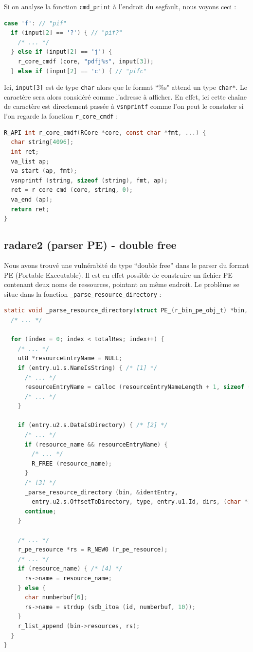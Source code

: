Si on analyse la fonction \lstinline{cmd_print} à l'endroit du segfault, nous voyons ceci :

\begin{lstlisting}[language=C]
case 'f': // "pif"
  if (input[2] == '?') { // "pif?"
    /* ... */
  } else if (input[2] == 'j') {
    r_core_cmdf (core, "pdfj%s", input[3]);
  } else if (input[2] == 'c') { // "pifc"
\end{lstlisting}

Ici, \lstinline{input[3]} est de type \lstinline{char} alors que le format ``\%s" attend un type \lstinline{char*}.
Le caractère sera alors considéré comme l'adresse à afficher.
En effet, ici cette chaîne de caractère est directement passée à \lstinline{vsnprintf} comme l'on peut le constater si l'on regarde la fonction \lstinline{r_core_cmdf} :

\begin{lstlisting}[language=C]
R_API int r_core_cmdf(RCore *core, const char *fmt, ...) {
  char string[4096];
  int ret;
  va_list ap;
  va_start (ap, fmt);
  vsnprintf (string, sizeof (string), fmt, ap);
  ret = r_core_cmd (core, string, 0);
  va_end (ap);
  return ret;
}
\end{lstlisting}

\subsection{radare2 (parser PE) - double free}

Nous avons trouvé une vulnérabité de type ``double free'' dans le parser du format PE (Portable Executable). Il est en effet possible de construire un fichier PE contenant deux noms de ressources, pointant au même endroit. Le problème se situe dans la fonction \lstinline{_parse_resource_directory} :

\begin{lstlisting}[language=C]
static void _parse_resource_directory(struct PE_(r_bin_pe_obj_t) *bin, Pe_image_resource_directory *dir, ut64 offDir, int type, int id, HtUU *dirs, char *resource_name) {
  /* ... */

  for (index = 0; index < totalRes; index++) {
    /* ... */
    ut8 *resourceEntryName = NULL;
    if (entry.u1.s.NameIsString) { /* [1] */
      /* ... */
      resourceEntryName = calloc (resourceEntryNameLength + 1, sizeof (ut8));
      /* ... */
    }

    if (entry.u2.s.DataIsDirectory) { /* [2] */
      /* ... */
      if (resource_name && resourceEntryName) {
        /* ... */
        R_FREE (resource_name);
      }
      /* [3] */
      _parse_resource_directory (bin, &identEntry,
        entry.u2.s.OffsetToDirectory, type, entry.u1.Id, dirs, (char *)resourceEntryName);
      continue;
    }

    /* ... */
    r_pe_resource *rs = R_NEW0 (r_pe_resource);
    /* ... */
    if (resource_name) { /* [4] */
      rs->name = resource_name;
    } else {
      char numberbuf[6];
      rs->name = strdup (sdb_itoa (id, numberbuf, 10));
    }
    r_list_append (bin->resources, rs);
  }
}
\end{lstlisting}

